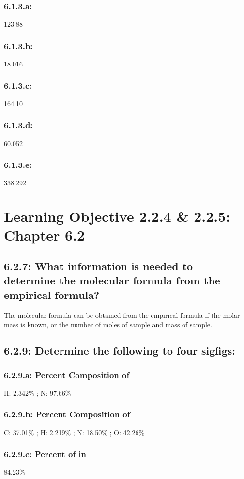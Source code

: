 \documentclass[11pt, letterpaper]{article}
\begin{document}
\subsubsection*{6.1.3.a: }
123.88
\subsubsection*{6.1.3.b: }
18.016
\subsubsection*{6.1.3.c: }
164.10
\subsubsection*{6.1.3.d: }
60.052
\subsubsection*{6.1.3.e: }
338.292

\section*{Learning Objective 2.2.4 \& 2.2.5: Chapter 6.2}
\subsection*{6.2.7: What information is needed to determine the molecular formula
from the empirical formula?}
The molecular formula can be obtained from the empirical formula if the molar mass is known,
or the number of moles of sample and mass of sample.

\subsection*{6.2.9: Determine the following to four sigfigs:}
\subsubsection*{6.2.9.a: Percent Composition of }
H: 2.342\% ; N: 97.66\%
\subsubsection*{6.2.9.b: Percent Composition of }
C: 37.01\% ; H: 2.219\% ; N: 18.50\% ; O: 42.26\%
\subsubsection*{6.2.9.c: Percent of  in }
84.23\%
\end{document}
